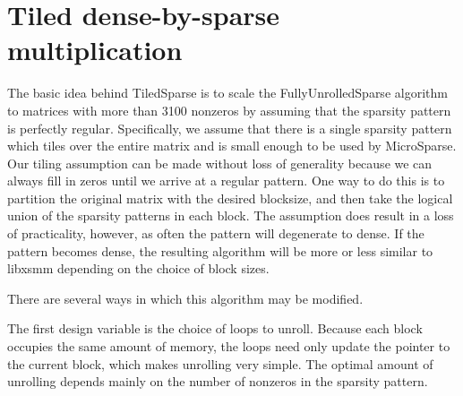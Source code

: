\section{Tiled dense-by-sparse multiplication}

     The basic idea behind TiledSparse is to scale the FullyUnrolledSparse algorithm to 
matrices with more than 3100 nonzeros by assuming that the sparsity pattern is perfectly regular. 
Specifically, we assume that there is a single sparsity pattern which tiles over the entire matrix and is small enough to be used by MicroSparse. Our tiling assumption can be made without loss 
of generality because we can always fill in zeros until we arrive at a regular pattern. One
way to do this is to partition the original matrix with the desired blocksize, and then take the 
logical union of the sparsity patterns in each block. The assumption does result in a loss of 
practicality, however, as often the pattern will degenerate to dense. If the pattern becomes dense, the resulting algorithm will be more or less similar to libxsmm depending on the choice of block sizes.

There are several ways in which this algorithm may be modified.

The first design variable is the choice of loops to unroll. Because each block occupies the same amount of memory, the loops need only update the pointer to the current block, which makes unrolling very simple. The optimal amount of unrolling depends mainly on the number of nonzeros in the sparsity pattern. 

